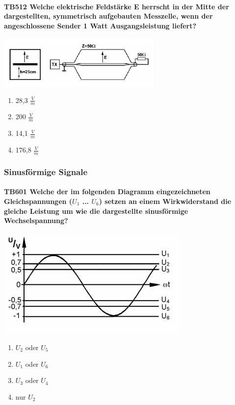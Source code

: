 \documentclass[8pt]{article}
\begin{document}
\begin{enumerate}
\paragraph*{TB512 Welche elektrische Feldstärke E herrscht in der Mitte der dargestellten, symmetrisch aufgebauten Messzelle, wenn der angeschlossene Sender 1 Watt Ausgangsleistung liefert?}
\begin{center}
	\begin{minipage}{\linewidth}
		\centering
		\includegraphics[scale=1.1]{pics/tb512_a.jpg}
	\end{minipage}
\end{center}
\begin{enumerate}[nolistsep,label=\Alph*]
\item 28,3 $\frac{V}{m}$
\item 200 $\frac{V}{m}$
\item 14,1 $\frac{V}{m}$
\item 176,8 $\frac{V}{m}$
\end{enumerate}


\pagebreak
\subsubsection{Sinusförmige Signale}

\paragraph*{TB601 Welche der im folgenden Diagramm eingezeichneten Gleichspannungen ($U_{1}$ ... $U_{6}$) setzen an einem Wirkwiderstand die gleiche Leistung um wie die dargestellte sinusförmige Wechselspannung?}
\begin{center}
	\begin{minipage}{\linewidth}
		\centering
		\includegraphics[scale=0.7]{pics/tb601_a.jpg}
	\end{minipage}
\end{center}
\begin{enumerate}[nolistsep,label=\Alph*]
\item $U_{2}$ oder $U_{5}$
\item $U_{1}$ oder $U_{6}$
\item $U_{3}$ oder $U_{4}$
\item nur $U_{2}$
\end{enumerate}




\end{enumerate}
\end{document}
